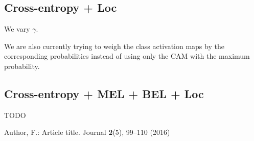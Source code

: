 \documentclass[runningheads]{llncs}
\begin{document}
\subsection{Cross-entropy + Loc}
We vary $\gamma$.

We are also currently trying to weigh the class activation maps by the corresponding probabilities
instead of using only the CAM with the maximum probability. 


\subsection{Cross-entropy + MEL + BEL + Loc}
TODO





%
%
% 
% 
%
\begin{thebibliography}{8}
Author, F.: Article title. Journal \textbf{2}(5), 99--110 (2016)

\end{thebibliography}
\end{document}
